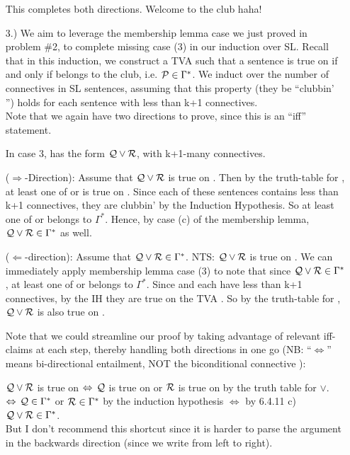 \documentclass[12pt]{memoir}
\begin{document}
\begin{enumerate}[1.)]
This completes both directions. Welcome to the club haha! \\



\item[3.)] We aim to leverage the membership lemma case we just proved in problem \#2, to complete missing case (3) in our induction over SL. Recall that in this induction, we construct a TVA  such that a sentence  is true on  if and only if  belongs to the club, i.e. $\mathcal{P} \in \Gamma^*$. We induct over the number of connectives in SL sentences, assuming that this property (they be ``clubbin' '') holds for each sentence with less than k+1 connectives. \\ Note that we again have two directions to prove, since this is an ``iff'' statement. 

In case 3,  has the form $\mathcal{Q} \vee \mathcal{R}$, with k+1-many connectives. 

($\Rightarrow$-Direction): Assume that $\mathcal{Q} \vee \mathcal{R}$ is true on . Then by the truth-table for \eor, at least one of  or  is true on . Since each of these sentences contains less than k+1 connectives, they are clubbin' by the Induction Hypothesis. So at least one of  or  belongs to $\Gamma^*$. Hence, by case (c) of the membership lemma, $\mathcal{Q} \vee \mathcal{R} \in \Gamma^*$ as well. 

($\Leftarrow$-direction): Assume that  $\mathcal{Q} \vee \mathcal{R} \in \Gamma^*$. NTS: $\mathcal{Q} \vee \mathcal{R}$ is true on . We can immediately apply membership lemma case (3) to note that since $\mathcal{Q} \vee \mathcal{R} \in \Gamma^*$, at least one of  or  belongs to $\Gamma^*$. Since  and  each have less than k+1 connectives, by the IH they are true on the TVA . So by the truth-table for \eor, $\mathcal{Q} \vee \mathcal{R}$ is also true on . 

Note that we could streamline our proof by taking advantage of relevant iff-claims at each step, thereby handling both directions in one go (NB: ``$ \Leftrightarrow$'' means bi-directional entailment, NOT the biconditional connective \eiff): 

$\mathcal{Q} \vee \mathcal{R}$ is true on  $ \Leftrightarrow\, {\mathcal{Q}}$ is true on   or ${\mathcal{R}}$ is true on   by the truth table for $\lor$.\\
$\Leftrightarrow\, {\mathcal{Q}} \in \Gamma^*$ or ${\mathcal{R}} \in \Gamma^*$ by the induction hypothesis
$\Leftrightarrow$ by 6.4.11 c) ${\mathcal{Q}} \lor {\ensuremath{\mathcal{R}}} \in \Gamma^*$.\\ But I don't recommend this shortcut since it is harder to parse the argument in the backwards direction (since we write from left to right). \\




\end{enumerate}
\end{document}
